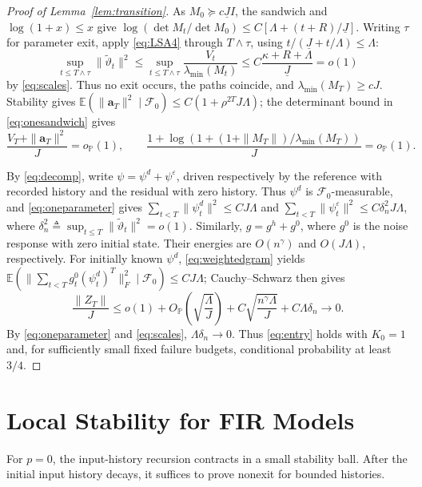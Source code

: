 \documentclass[11pt,reqno]{amsart}
\numberwithin{equation}{section}
\theoremstyle{definition}
\theoremstyle{remark}
\newcommand{\E}{\mathbb E}
\newcommand{\Prob}{\mathbb P}
\newcommand{\F}{\mathcal F}
\newcommand{\etac}{\widetilde{\vartheta}}
\begin{document}
\begin{proof}[Proof of Lemma~\ref{lem:transition}]
As $M_0\succeq c\underline J I$, the sandwich and $\log(1+x)\le x$ give
$\log(\det M_t/\det M_0)\le C[\Lambda+(t+R)/\underline J]$.
Writing $\tau$ for parameter exit, apply \eqref{eq:LSA4} through $T\wedge\tau$, using $t/(\underline J+t/\Lambda)\le\Lambda$:
\begin{equation}\label{eq:oneparameter}
 \sup_{t\le T\wedge\tau}\|\etac_t\|^2
 \le\sup_{t\le T\wedge\tau}\frac{V_t}{\lambda_{\min}(M_t)}
 \le C\frac{\kappa+R+\Lambda}{\underline J}=o(1)
\end{equation}
by \eqref{eq:scales}. Thus no exit occurs, the paths coincide, and $\lambda_{\min}(M_T)\ge cJ$. Stability gives $\E(\|\mathbf a_T\|^2\mid\F_0)\le C(1+\rho^{2T}J\Lambda)$; the determinant bound in \eqref{eq:onesandwich} gives
\begin{equation*}
 \frac{V_T+\|\mathbf a_T\|^2}{J}=o_{\Prob}(1),\qquad
 \frac{1+\log(1+(1+\|M_T\|)/\lambda_{\min}(M_T))}{J}=o_{\Prob}(1).
\end{equation*}


By \eqref{eq:decomp}, write $\psi=\psi^d+\psi^\varepsilon$, driven respectively by the reference with recorded history and the residual with zero history. Thus $\psi^d$ is $\F_0$-measurable, and \eqref{eq:oneparameter} gives
$\sum_{t<T}\|\psi_t^d\|^2\le CJ\Lambda$ and $\sum_{t<T}\|\psi_t^\varepsilon\|^2\le C\delta_n^2J\Lambda$, where $\delta_n^2\triangleq\sup_{t\le T}\|\etac_t\|^2=o(1)$.
Similarly, $g=g^h+g^0$, where $g^0$ is the noise response with zero initial state. Their energies are $O(n^\gamma)$ and $O(J\Lambda)$, respectively. For initially known $\psi^d$, \eqref{eq:weightedgram} yields
$\E(\|\sum_{t<T}g_t^0(\psi_t^d)^T\|_F^2\mid\F_0)\le CJ\Lambda$; Cauchy--Schwarz then gives
\begin{equation*}
 \frac{\|Z_T\|}{J}\le o(1)+O_{\Prob}\!\left(\sqrt{\frac{\Lambda}{J}}\right)
 +C\sqrt{\frac{n^\gamma\Lambda}{J}}
 +C\Lambda\delta_n\longrightarrow0.
\end{equation*}
By \eqref{eq:oneparameter} and \eqref{eq:scales}, $\Lambda\delta_n\to0$. Thus \eqref{eq:entry} holds with $K_0=1$ and, for sufficiently small fixed failure budgets, conditional probability at least $3/4$.
\end{proof}
\section{Local Stability for FIR Models}\label{sec:fir}
For $p=0$, the input-history recursion contracts in a small stability ball. After the initial input history decays, it suffices to prove nonexit for bounded histories.
\end{document}

